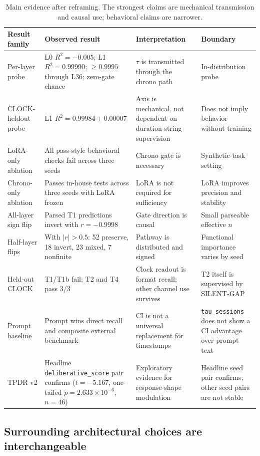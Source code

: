 \documentclass[conference,10pt]{IEEEtran}
\newcommand{\tabhead}[1]{\textbf{#1}}
\newcommand{\CI}{\textsc{CI}}
\newcommand{\Tau}{\tau}
\begin{document}
\begin{table}[t]
\centering
\caption{Main evidence after reframing. The strongest claims are mechanical transmission and causal use; behavioral claims are narrower.}
\label{tab:mainresults}
\scriptsize
\begin{tabular}{@{}p{}p{}p{}p{}@{}}
\toprule
\tabhead{Result family} & \tabhead{Observed result} & \tabhead{Interpretation} & \tabhead{Boundary}\\
\midrule
Per-layer probe & L0 $R^2=-0.005$; L1 $R^2=0.99990$; $\geq0.9995$ through L36; zero-gate chance & $\Tau$ is transmitted through the chrono path & In-distribution probe \\
CLOCK-heldout probe & L1 $R^2=0.99984\pm0.00007$ & Axis is mechanical, not dependent on duration-string supervision & Does not imply behavior without training \\
LoRA-only ablation & All pass-style behavioral checks fail across three seeds & Chrono gate is necessary & Synthetic-task setting \\
Chrono-only ablation & Passes in-house tests across three seeds with LoRA frozen & LoRA is not required for sufficiency & LoRA improves precision and stability \\
All-layer sign flip & Parsed T1 predictions invert with $r=-0.9998$ & Gate direction is causal & Small parseable effective $n$ \\
Half-layer flips & With $|r|>0.5$: 52 preserve, 18 invert, 23 mixed, 7 nonfinite & Pathway is distributed and signed & Functional importance varies by seed \\
Held-out CLOCK & T1/T1b fail; T2 and T4 pass 3/3 & Clock readout is format recall; other channel use survives & T2 itself is supervised by SILENT-GAP \\
Prompt baseline & Prompt wins direct recall and composite external benchmark & \CI{} is not a universal replacement for timestamps & \texttt{tau\_sessions} does not show a CI advantage over prompt text \\
TPDR v2 & Headline \texttt{deliberative\_score} pair confirms ($t=-5.167$, one-tailed $p=2.633\times10^{-6}$, $n=46$) & Exploratory evidence for response-shape modulation & Headline seed pair confirms; other seed pairs are not stable \\
\bottomrule
\end{tabular}
\end{table}

\subsection{Surrounding architectural choices are interchangeable}
\end{document}
